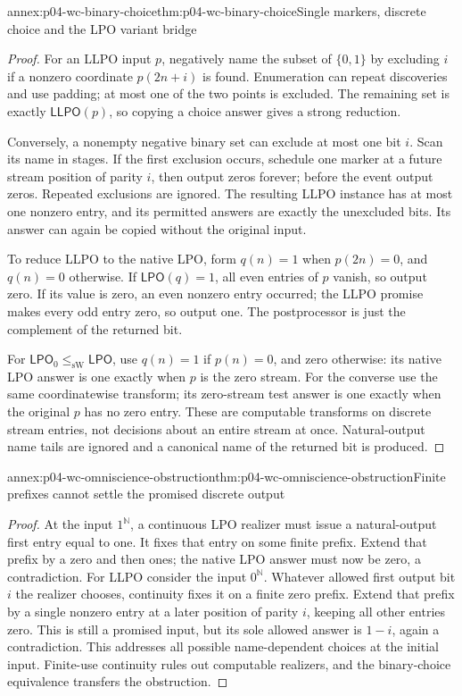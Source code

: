 \begin{annexitem}{annex:p04-wc-binary-choice}{thm:p04-wc-binary-choice}{Single markers, discrete choice and the LPO variant bridge}
\begin{proof}
For an LLPO input \(p\), negatively name the subset of \(\{0,1\}\)
by excluding \(i\) if a nonzero coordinate \(p(2n+i)\) is found.
Enumeration can repeat discoveries and use padding; at most one of
the two points is excluded. The remaining set is exactly
\(\mathsf{LLPO}(p)\), so copying a choice answer gives a strong reduction.

Conversely, a nonempty negative binary set can exclude at most one bit
\(i\). Scan its name in stages. If the first exclusion occurs, schedule
one marker at a future stream position of parity \(i\), then output
zeros forever; before the event output zeros. Repeated exclusions are
ignored. The resulting LLPO instance has at most one nonzero entry,
and its permitted answers are exactly the unexcluded bits. Its answer
can again be copied without the original input.

To reduce LLPO to the native LPO, form
\(q(n)=1\) when \(p(2n)=0\), and \(q(n)=0\) otherwise.
If \(\mathsf{LPO}(q)=1\), all even entries of \(p\) vanish, so
output zero. If its value is zero, an even nonzero entry occurred;
the LLPO promise makes every odd entry zero, so output one.
The postprocessor is just the complement of the returned bit.

For \(\mathsf{LPO}_0\leq_{\mathrm{sW}}\mathsf{LPO}\), use
\(q(n)=1\) if \(p(n)=0\), and zero otherwise: its native LPO
answer is one exactly when \(p\) is the zero stream.
For the converse use the same coordinatewise transform; its zero-stream
test answer is one exactly when the original \(p\) has no zero entry.
These are computable transforms on discrete stream entries, not
decisions about an entire stream at once. Natural-output name tails
are ignored and a canonical name of the returned bit is produced.
\end{proof}
\end{annexitem}

\begin{annexitem}{annex:p04-wc-omniscience-obstruction}{thm:p04-wc-omniscience-obstruction}{Finite prefixes cannot settle the promised discrete output}
\begin{proof}
At the input \(1^{\mathbb N}\), a continuous LPO realizer must
issue a natural-output first entry equal to one. It fixes that entry
on some finite prefix. Extend that prefix by a zero and then ones;
the native LPO answer must now be zero, a contradiction.
For LLPO consider the input \(0^{\mathbb N}\). Whatever allowed
first output bit \(i\) the realizer chooses, continuity fixes it on
a finite zero prefix. Extend that prefix by a single nonzero entry
at a later position of parity \(i\), keeping all other entries zero.
This is still a promised input, but its sole allowed answer is
\(1-i\), again a contradiction. This addresses all possible
name-dependent choices at the initial input. Finite-use continuity
rules out computable realizers, and the binary-choice equivalence
transfers the obstruction.
\end{proof}
\end{annexitem}

